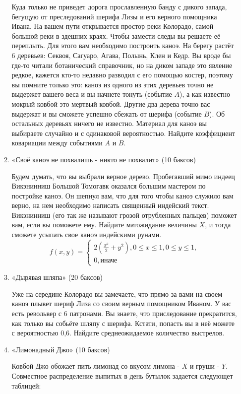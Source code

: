 \documentclass[11pt, a4paper]{article}
\renewcommand{\leq}{\leqslant}
\theoremstyle{definition}
\begin{document}
\begin{enumerate}
\begin{enumerate}
    Куда только не приведет дорога прославленную банду с дикого запада, бегущую от преследований шерифа Лизы и его верного помощника Ивана. 
    На вашем пути открывается простор реки Колорадо, самой большой реки в здешних краях. Чтобы замести следы вы решаете её переплыть. Для этого вам необходимо построить каноэ. На берегу растёт 6 деревьев: Секвоя, Сагуаро, Агава, Полынь, Клен и Кедр. Вы вроде бы где-то читали ботанический справочник, но на диком западе это явление редкое, кажется кто-то недавно разводил с его помощью костер, поэтому вы помните только это: каноэ из одного из этих деревьев точно не выдержет вашего веса и вы начнете тонуть (событие $A$), а как известно мокрый ковбой это мертвый ковбой. Другие два дерева точно вас выдержат и вы сможете успешно сбежать от шерифа (событие $B$). Об остальных деревьях ничего не известно. Материал для каноэ вы выбираете случайно и с одинаковой вероятностью. Найдите коэффициент ковариации между событиями $A$ и $B$.
    \item «Своё каноэ не похвалишь - никто не похвалит» (10 баксов)
    
    Будем думать, что вы выбрали верное дерево. Пробегавший мимо индеец Викэнинниш Большой Томогавк оказался большим мастером по постройке каноэ. Он шепнул вам, что для того чтобы каноэ служило вам верно, на нем необходимо написать священный индейский текст. Викэнинниш (его так же называют грозой отрубленных пальцев) поможет вам, если вы поможете ему. Найдите матожидание величины $X$, и тогда сможете усыпать свое каноэ индейскими рунами. 
\[
   f(x, y)=
   \begin{cases} 
   2(\frac{x^2}{2} + y^2), 0 \leq x \leq 1, 0 \leq y \leq 1, \\
    0, \text{иначе}
    \end{cases}
\]
\newpage
    \item «Дырявая шляпа» (20 баксов)
    
    Уже на середине Колорадо вы замечаете, что прямо за вами на своем каноэ плывет шериф Лиза со своим верным помощником Иваном. 
    У вас есть револьвер с 6 патронами. Вы знаете, что приследование прекратится, как только вы собьёте шляпу с шерифа. Кстати, попасть вы в неё можете с вероятностью 0,6. Найдите среднеожидаемое количество выстрелов. 
    \item «Лимонадный Джо» (10 баксов)
    
    Ковбой Джо обожает пить лимонад со вкусом лимона - $X$ и груши - $Y$. Совместное распределение выпитых в день бутылок задается следующет таблицей:
    

\end{enumerate}
\end{enumerate}
\end{document}
